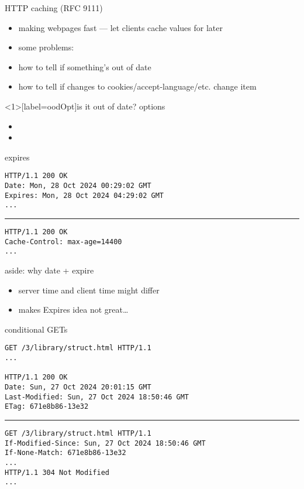 \begin{frame}{HTTP caching (RFC 9111)}
    \begin{itemize}
    \item making webpages fast --- let clients cache values for later
    \item some problems:
    \vspace{.5cm}
    \item how to tell if something's out of date
    \item how to tell if changes to cookies/accept-language/etc. change item
    \end{itemize}
\end{frame}

\begin{frame}<1>[label=oodOpt]{is it out of date? options}
    \begin{itemize}
    \item {}
    \item {}
    \end{itemize}
\end{frame}


\begin{frame}[fragile]{expires}
\begin{Verbatim}
HTTP/1.1 200 OK
Date: Mon, 28 Oct 2024 00:29:02 GMT
Expires: Mon, 28 Oct 2024 04:29:02 GMT
...
\end{Verbatim}
\rule{0.9\textwidth}{1mm}
\begin{Verbatim}
HTTP/1.1 200 OK
Cache-Control: max-age=14400
...
\end{Verbatim}
\end{frame}

\begin{frame}{aside: why date + expire}
    \begin{itemize}
    \item server time and client time might differ
    \item makes Expires idea not great\ldots
    \end{itemize}
\end{frame}


\begin{frame}[fragile]{conditional GETs}
\begin{Verbatim}[fontsize=\fontsize{12}{13}]
GET /3/library/struct.html HTTP/1.1
...

HTTP/1.1 200 OK
Date: Sun, 27 Oct 2024 20:01:15 GMT
Last-Modified: Sun, 27 Oct 2024 18:50:46 GMT
ETag: 671e8b86-13e32
\end{Verbatim}
\rule{0.9\textwidth}{1mm}
\begin{Verbatim}[fontsize=\fontsize{12}{13}]
GET /3/library/struct.html HTTP/1.1
If-Modified-Since: Sun, 27 Oct 2024 18:50:46 GMT
If-None-Match: 671e8b86-13e32
...
HTTP/1.1 304 Not Modified
...
\end{Verbatim}
\end{frame}

